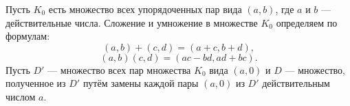 \begin{rusblock}
Пусть $K_0$ есть множество всех упорядоченных пар вида $(a,b)$, где $a$ и $b$ --- действительные числа. Сложение и умножение в множестве $K_0$ определяем по формулам:
\[
(a,b)+(c,d)=(a+c,b+d),
\]
\[
(a,b)(c,d)=(ac-bd,ad+bc).
\]
Пусть $D'$ --- множество всех пар множества $K_0$ вида $(a,0)$ и $D$ --- множество, полученное из $D'$ путём замены каждой пары $(a,0)$ из $D'$ действительным числом $a$.
\end{rusblock}

\endgroup
